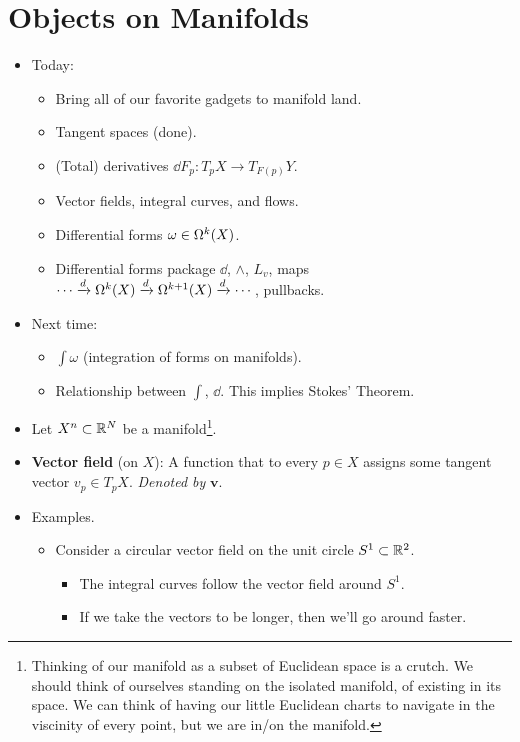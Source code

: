 \documentclass[../notes.tex]{subfiles}
\begin{document}
\section{Objects on Manifolds}
\begin{itemize}
    \item {}Today:
    \begin{itemize}
        \item Bring all of our favorite gadgets to manifold land.
        \item Tangent spaces (done).
        \item (Total) derivatives $\dd F_p:T_pX\to T_{F(p)}Y$.
        \item Vector fields, integral curves, and flows.
        \item Differential forms $\omega\in\ome[k]{X}$.
        \item Differential forms package $\dd$, $\wedge$, $L_v$, maps $\cdots\xrightarrow{d}\ome[k]{X}\xrightarrow{d}\ome[k+1]{X}\xrightarrow{d}\cdots$, pullbacks.
    \end{itemize}
    \item Next time:
    \begin{itemize}
        \item $\int\omega$ (integration of forms on manifolds).
        \item Relationship between $\int$, $\dd$. This implies Stokes' Theorem.
    \end{itemize}
    \item Let $X^n\subset\R^N$ be a manifold\footnote{Thinking of our manifold as a subset of Euclidean space is a crutch. We should think of ourselves standing on the isolated manifold, of existing in its space. We can think of having our little Euclidean charts to navigate in the viscinity of every point, but we are in/on the manifold.}.
    \item \textbf{Vector field} (on $X$): A function that to every $p\in X$ assigns some tangent vector $v_p\in T_pX$. \emph{Denoted by} $\bm{v}$.
    \item Examples.
    \begin{itemize}
        \item Consider a circular vector field on the unit circle $S^1\subset\R^2$.
        \begin{itemize}
            \item The integral curves follow the vector field around $S^1$.
            \item If we take the vectors to be longer, then we'll go around faster.

\end{itemize}
\end{itemize}
\end{itemize}
\end{document}

